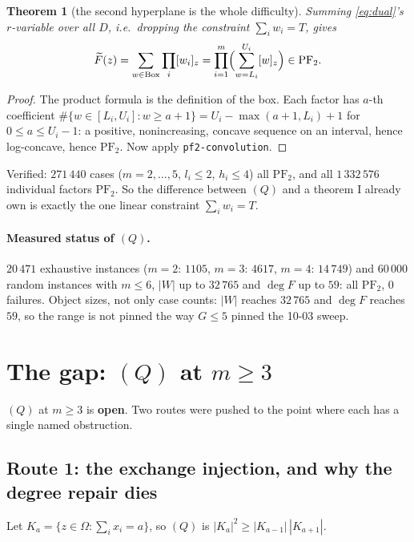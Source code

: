 \documentclass[11pt]{article}
\theoremstyle{plain}
\newtheorem{theorem}{Theorem}
\theoremstyle{definition}
\newcommand{\PFtwo}{\mathrm{PF}_2}
\begin{document}
\begin{theorem}[the second hyperplane is the whole difficulty]\label{thm:free}
Summing \eqref{eq:dual}'s $r$-variable over \emph{all} $D$, i.e.\ dropping the constraint
$\sum_iw_i=T$, gives
\[
  \widetilde F(z)=\sum_{w\in\mathrm{Box}}\prod_i[w_i]_z
  =\prod_{i=1}^m\Bigl(\sum_{w=L_i}^{U_i}[w]_z\Bigr)\in\PFtwo .
\]
\end{theorem}
\begin{proof}
The product formula is the definition of the box. Each factor has $a$-th coefficient
$\#\{w\in[L_i,U_i]:w\ge a+1\}=U_i-\max(a+1,L_i)+1$ for $0\le a\le U_i-1$: a positive,
nonincreasing, concave sequence on an interval, hence log-concave, hence $\PFtwo$. Now
apply \texttt{pf2-convolution}.
\end{proof}
Verified: $271\,440$ cases ($m=2,\dots,5$, $l_i\le2$, $h_i\le4$) all $\PFtwo$, and all
$1\,332\,576$ individual factors $\PFtwo$. So the difference between $(Q)$ and a theorem I
already own is exactly the one linear constraint $\sum_iw_i=T$.

\paragraph{Measured status of $(Q)$.} $20\,471$ exhaustive instances
($m=2$: $1105$, $m=3$: $4617$, $m=4$: $14\,749$) and $60\,000$ random instances with
$m\le6$, $|W|$ up to $32\,765$ and $\deg F$ up to $59$: all $\PFtwo$, $0$ failures.
Object sizes, not only case counts: $|W|$ reaches $32\,765$ and $\deg F$ reaches $59$,
so the range is not pinned the way $G\le5$ pinned the 10-03 sweep.

\section{The gap: $(Q)$ at $m\ge3$}\label{sec:gap}

$(Q)$ at $m\ge3$ is \textbf{open}. Two routes were pushed to the point where each has a
single named obstruction.

\subsection*{Route 1: the exchange injection, and why the degree repair dies}

Let $K_a=\{z\in\Omega:\sum_ix_i=a\}$, so $(Q)$ is $|K_a|^2\ge|K_{a-1}|\,|K_{a+1}|$.
\end{document}
